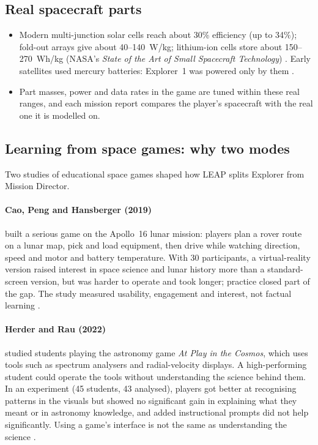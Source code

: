 \documentclass[11pt,a4paper]{article}
\begin{document}
\subsection{Real spacecraft parts}
\begin{itemize}
  \item Modern multi-junction solar cells reach about 30\% efficiency (up to 34\%); fold-out arrays give about
        40--140~W/kg; lithium-ion cells store about 150--270~Wh/kg (NASA's \emph{State of the Art of Small Spacecraft
        Technology}) \cite{soa}. Early satellites used mercury batteries: Explorer~1 was powered only by them
        \cite{explorer1}.
  \item Part masses, power and data rates in the game are tuned within these real ranges, and each mission report
        compares the player's spacecraft with the real one it is modelled on.
\end{itemize}

\subsection{Learning from space games: why two modes}\label{sec:learning}
Two studies of educational space games shaped how LEAP splits Explorer from Mission Director.

\paragraph{Cao, Peng and Hansberger (2019)} built a serious game on the Apollo~16 lunar mission: players plan a rover
route on a lunar map, pick and load equipment, then drive while watching direction, speed and motor and battery
temperature. With 30 participants, a virtual-reality version raised interest in space science and lunar history more
than a standard-screen version, but was harder to operate and took longer; practice closed part of the gap. The study
measured usability, engagement and interest, not factual learning \cite{cao2019}.

\paragraph{Herder and Rau (2022)} studied students playing the astronomy game \emph{At Play in the Cosmos}, which uses
tools such as spectrum analysers and radial-velocity displays. A high-performing student could operate the tools
without understanding the science behind them. In an experiment (45 students, 43 analysed), players got better at
recognising patterns in the visuals but showed no significant gain in explaining what they meant or in astronomy
knowledge, and added instructional prompts did not help significantly. Using a game's interface is not the same as
understanding the science \cite{herder2022}.
\end{document}
